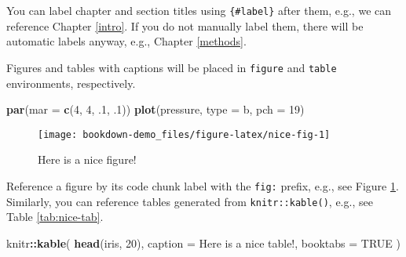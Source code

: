 \documentclass[
]{book}
\newenvironment{Shaded}{\begin{snugshade}}{\end{snugshade}}
\newcommand{\AttributeTok}[1]{\textcolor[rgb]{0.13,0.29,0.53}{#1}}
\newcommand{\ConstantTok}[1]{\textcolor[rgb]{0.56,0.35,0.01}{#1}}
\newcommand{\DecValTok}[1]{\textcolor[rgb]{0.00,0.00,0.81}{#1}}
\newcommand{\FunctionTok}[1]{\textcolor[rgb]{0.13,0.29,0.53}{\textbf{#1}}}
\newcommand{\NormalTok}[1]{#1}
\newcommand{\SpecialCharTok}[1]{\textcolor[rgb]{0.81,0.36,0.00}{\textbf{#1}}}
\newcommand{\StringTok}[1]{\textcolor[rgb]{0.31,0.60,0.02}{#1}}
\theoremstyle{definition}
\theoremstyle{definition}
\theoremstyle{definition}
\theoremstyle{definition}
\theoremstyle{remark}
\begin{document}
You can label chapter and section titles using \texttt{\{\#label\}} after them, e.g., we can reference Chapter \ref{intro}. If you do not manually label them, there will be automatic labels anyway, e.g., Chapter \ref{methods}.

Figures and tables with captions will be placed in \texttt{figure} and \texttt{table} environments, respectively.

\begin{Shaded}
\begin{Highlighting}[]
\FunctionTok{par}\NormalTok{(}\AttributeTok{mar =} \FunctionTok{c}\NormalTok{(}\DecValTok{4}\NormalTok{, }\DecValTok{4}\NormalTok{, .}\DecValTok{1}\NormalTok{, .}\DecValTok{1}\NormalTok{))}
\FunctionTok{plot}\NormalTok{(pressure, }\AttributeTok{type =} \StringTok{\textquotesingle{}b\textquotesingle{}}\NormalTok{, }\AttributeTok{pch =} \DecValTok{19}\NormalTok{)}
\end{Highlighting}
\end{Shaded}

\begin{figure}

{\centering \texttt{[image: bookdown-demo\_files/figure-latex/nice-fig-1]} 

}

\caption{Here is a nice figure!}\label{fig:nice-fig}
\end{figure}

Reference a figure by its code chunk label with the \texttt{fig:} prefix, e.g., see Figure \ref{fig:nice-fig}. Similarly, you can reference tables generated from \texttt{knitr::kable()}, e.g., see Table \ref{tab:nice-tab}.

\begin{Shaded}
\begin{Highlighting}[]
\NormalTok{knitr}\SpecialCharTok{::}\FunctionTok{kable}\NormalTok{(}
  \FunctionTok{head}\NormalTok{(iris, }\DecValTok{20}\NormalTok{), }\AttributeTok{caption =} \StringTok{\textquotesingle{}Here is a nice table!\textquotesingle{}}\NormalTok{,}
  \AttributeTok{booktabs =} \ConstantTok{TRUE}
\NormalTok{)}
\end{Highlighting}
\end{Shaded}
\end{document}
